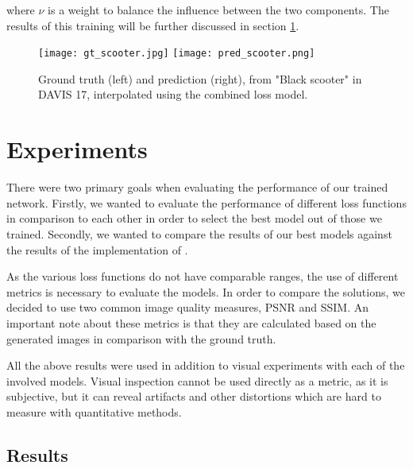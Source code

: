 \documentclass[10pt,twocolumn,letterpaper]{article}
\begin{document}
where $\nu$ is a weight to balance the influence between the two components. The results of this training will be further discussed in section \ref{sec:experiments}.


\begin{figure*}
    \begin{center}
    	\texttt{[image: gt\_scooter.jpg]}
    	\texttt{[image: pred\_scooter.png]}
    \end{center}
    \caption{Ground truth (left) and prediction (right), from "Black scooter" in DAVIS 17, interpolated using the combined loss model.}
    \label{fig:scooter}
\end{figure*}


\section{Experiments}
\label{sec:experiments}

There were two primary goals when evaluating the performance of our trained network. Firstly, we wanted to evaluate the performance of different loss functions in comparison to each other in order to select the best model out of those we trained. Secondly, we wanted to compare the results of our best models against the results of the implementation of \citeauthor{SepConv}.

As the various loss functions do not have comparable ranges, the use of different metrics is necessary to evaluate the models. In order to compare the solutions, we decided to use two common image quality measures, PSNR and SSIM. An important note about these metrics is that they are calculated based on the generated images in comparison with the ground truth.

All the above results were used in addition to visual experiments with each of the involved models. Visual inspection cannot be used directly as a metric, as it is subjective, but it can reveal artifacts and other distortions which are hard to measure with quantitative methods.


\subsection{Results}
\label{sec:results}
\end{document}

